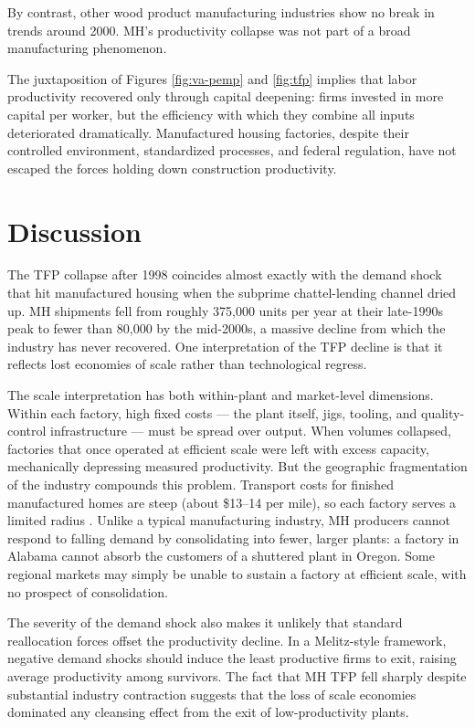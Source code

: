 \documentclass[11pt,article,oneside]{memoir}
\begin{document}
By contrast, other wood product manufacturing industries show no break
in trends around 2000. MH's productivity collapse was not part of a
broad manufacturing phenomenon.

The juxtaposition of Figures \ref{fig:va-pemp} and \ref{fig:tfp} implies
that labor productivity recovered only through capital deepening: firms
invested in more capital per worker, but the efficiency with which they
combine all inputs deteriorated dramatically. Manufactured housing
factories, despite their controlled environment, standardized processes,
and federal regulation, have not escaped the forces holding down
construction productivity.

\hypertarget{discussion}{%
\section{Discussion}\label{discussion}}

The TFP collapse after 1998 coincides almost exactly with the demand
shock that hit manufactured housing when the subprime chattel-lending
channel dried up. MH shipments fell from roughly 375,000 units per year
at their late-1990s peak to fewer than 80,000 by the mid-2000s, a
massive decline from which the industry has never recovered. One
interpretation of the TFP decline is that it reflects lost economies of
scale rather than technological regress.

The scale interpretation has both within-plant and market-level
dimensions. Within each factory, high fixed costs --- the plant itself,
jigs, tooling, and quality-control infrastructure --- must be spread
over output. When volumes collapsed, factories that once operated at
efficient scale were left with excess capacity, mechanically depressing
measured productivity. But the geographic fragmentation of the industry
compounds this problem. Transport costs for finished manufactured homes
are steep (about \$13--14 per mile), so each factory serves a limited
radius \citep{jensen_manufactured_2024}. Unlike a typical manufacturing
industry, MH producers cannot respond to falling demand by consolidating
into fewer, larger plants: a factory in Alabama cannot absorb the
customers of a shuttered plant in Oregon. Some regional markets may
simply be unable to sustain a factory at efficient scale, with no
prospect of consolidation.

The severity of the demand shock also makes it unlikely that standard
reallocation forces offset the productivity decline. In a Melitz-style
framework, negative demand shocks should induce the least productive
firms to exit, raising average productivity among survivors. The fact
that MH TFP fell sharply despite substantial industry contraction
suggests that the loss of scale economies dominated any cleansing effect
from the exit of low-productivity plants.
\end{document}
